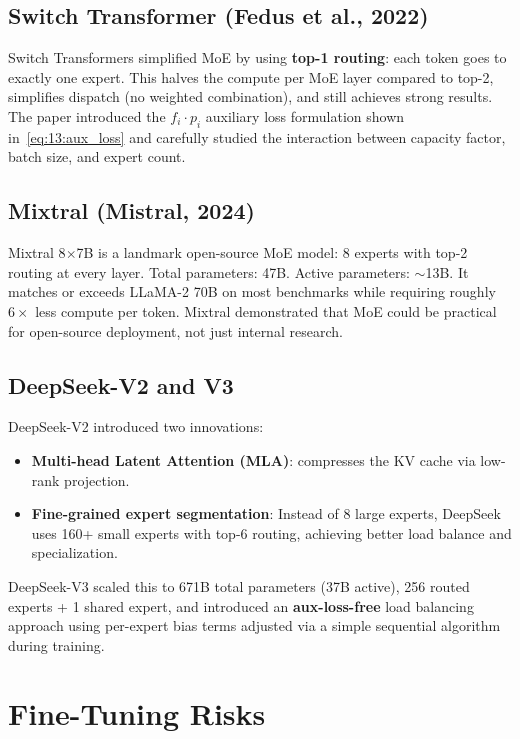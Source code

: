 \subsection{Switch Transformer (Fedus et al., 2022)}
Switch Transformers \cite{switch_transformers_2021} simplified MoE by using \textbf{top-1 routing}: each token goes to exactly one expert. This halves the compute per MoE layer compared to top-2, simplifies dispatch (no weighted combination), and still achieves strong results. The paper introduced the $f_i \cdot p_i$ auxiliary loss formulation shown in~\cref{eq:13:aux_loss} and carefully studied the interaction between capacity factor, batch size, and expert count.

\subsection{Mixtral (Mistral, 2024)}
Mixtral 8$\times$7B \cite{mixtral} is a landmark open-source MoE model: 8 experts with top-2 routing at every layer. Total parameters: 47B. Active parameters: $\sim$13B. It matches or exceeds LLaMA-2 70B on most benchmarks while requiring roughly $6\times$ less compute per token. Mixtral demonstrated that MoE could be practical for open-source deployment, not just internal research.

\subsection{DeepSeek-V2 and V3}
DeepSeek-V2 \cite{deepseek_v2} introduced two innovations:
\begin{itemize}
  \item \textbf{Multi-head Latent Attention (MLA)}: compresses the KV cache via low-rank projection.
  \item \textbf{Fine-grained expert segmentation}: Instead of 8 large experts, DeepSeek uses 160+ small experts with top-6 routing, achieving better load balance and specialization.
\end{itemize}
DeepSeek-V3 \cite{deepseek_v3} scaled this to 671B total parameters (37B active), 256 routed experts + 1 shared expert, and introduced an \textbf{aux-loss-free} \cite{auxfree_2024} load balancing approach using per-expert bias terms adjusted via a simple sequential algorithm during training.

\section{Fine-Tuning Risks}
\label{ch:13:sec:finetuning}

